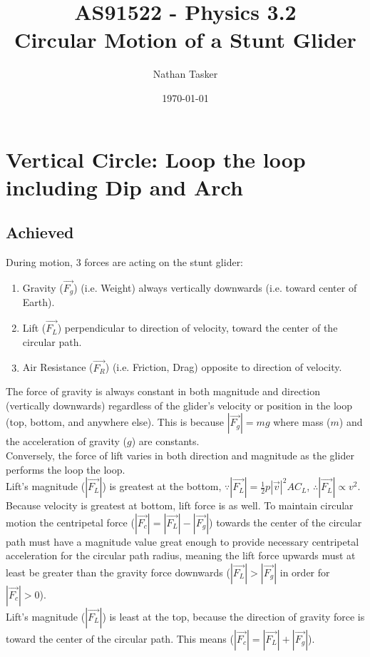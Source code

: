 \documentclass[11pt, a4paper]{article}
\title{\small AS91522 - Physics 3.2\\ \huge Circular Motion of a Stunt Glider}
\author{Nathan Tasker}
\date{\today}
\def\ParagraphSpacing{30pt}
\begin{document}
	\maketitle
	\tableofcontents
	\newpage
	\section{Vertical Circle: Loop the loop including Dip and Arch}
	\subsection{Achieved}
	During motion, 3 forces are acting on the stunt glider:
	\begin{enumerate}
		\item Gravity ($\vec{F_g}$) (i.e. Weight) always vertically downwards (i.e. toward center of Earth).
		\item Lift ($\vec{F_L}$) perpendicular to direction of velocity, toward the center of the circular path.
		\item Air Resistance ($\vec{F_R}$) (i.e. Friction, Drag) opposite to direction of velocity.
	\end{enumerate}
	\vspace{\ParagraphSpacing}
	The force of gravity is always constant in both magnitude and direction (vertically downwards) regardless of the glider's velocity or position in the loop (top, bottom, and anywhere else). This is because $|\vec{F_g}|=mg$ where mass ($m$) and the acceleration of gravity ($g$) are constants.\\[\ParagraphSpacing]
	Conversely, the force of lift varies in both direction and magnitude as the glider performs the loop the loop.\\
	Lift's magnitude ($|\vec{F_L}|$) is greatest at the bottom, $\because |\vec{F_L}|=\frac{1}{2}p|\vec{v}|^2AC_L$, $\therefore |\vec{F_L}|\propto v^2$. Because velocity is greatest at bottom, lift force is as well. To maintain circular motion the centripetal force ($|\vec{F_c}|=|\vec{F_L}|-|\vec{F_g}|$) towards the center of the circular path must have a magnitude value great enough to provide necessary centripetal acceleration for the circular path radius, meaning the lift force upwards must at least be greater than the gravity force downwards ($|\vec{F_L}|>|\vec{F_g}|$ in order for $|\vec{F_c}|>0$).\\
	Lift's magnitude ($|\vec{F_L}|$) is least at the top, because the direction of gravity force is toward the center of the circular path. This means ($|\vec{F_c}|=|\vec{F_L}|+|\vec{F_g}|$).\\
\end{document}
